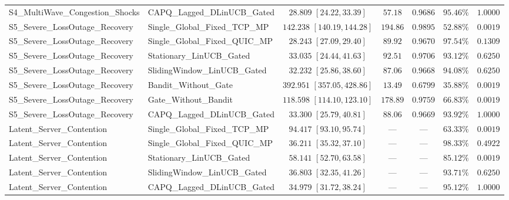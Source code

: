 \documentclass[10pt,journal,compsoc]{IEEEtran}
\begin{document}
\begin{table}[!t]
\begin{adjustbox}{max width=\textwidth}
\begin{tabular}{@{}llccccc@{}}
S4\_MultiWave\_Congestion\_Shocks & CAPQ\_Lagged\_DLinUCB\_Gated & $28.809$ $[24.22, 33.39]$ & $57.18$ & $0.9686$ & $95.46\%$ & $1.0000$ \\
S5\_Severe\_LossOutage\_Recovery & Single\_Global\_Fixed\_TCP\_MP & $142.238$ $[140.19, 144.28]$ & $194.86$ & $0.9895$ & $52.88\%$ & $0.0019$ \\
S5\_Severe\_LossOutage\_Recovery & Single\_Global\_Fixed\_QUIC\_MP & $28.243$ $[27.09, 29.40]$ & $89.92$ & $0.9670$ & $97.54\%$ & $0.1309$ \\
S5\_Severe\_LossOutage\_Recovery & Stationary\_LinUCB\_Gated & $33.035$ $[24.44, 41.63]$ & $92.51$ & $0.9706$ & $93.12\%$ & $0.6250$ \\
S5\_Severe\_LossOutage\_Recovery & SlidingWindow\_LinUCB\_Gated & $32.232$ $[25.86, 38.60]$ & $87.06$ & $0.9668$ & $94.08\%$ & $0.6250$ \\
S5\_Severe\_LossOutage\_Recovery & Bandit\_Without\_Gate & $392.951$ $[357.05, 428.86]$ & $13.49$ & $0.6799$ & $35.88\%$ & $0.0019$ \\
S5\_Severe\_LossOutage\_Recovery & Gate\_Without\_Bandit & $118.598$ $[114.10, 123.10]$ & $178.89$ & $0.9759$ & $66.83\%$ & $0.0019$ \\
S5\_Severe\_LossOutage\_Recovery & CAPQ\_Lagged\_DLinUCB\_Gated & $33.300$ $[25.79, 40.81]$ & $88.06$ & $0.9669$ & $93.92\%$ & $1.0000$ \\
\midrule
Latent\_Server\_Contention & Single\_Global\_Fixed\_TCP\_MP & $94.417$ $[93.10, 95.74]$ & --- & --- & $63.33\%$ & $0.0019$ \\
Latent\_Server\_Contention & Single\_Global\_Fixed\_QUIC\_MP & $36.211$ $[35.32, 37.10]$ & --- & --- & $98.33\%$ & $0.4922$ \\
Latent\_Server\_Contention & Stationary\_LinUCB\_Gated & $58.141$ $[52.70, 63.58]$ & --- & --- & $85.12\%$ & $0.0019$ \\
Latent\_Server\_Contention & SlidingWindow\_LinUCB\_Gated & $36.803$ $[32.35, 41.26]$ & --- & --- & $93.71\%$ & $0.6250$ \\
Latent\_Server\_Contention & CAPQ\_Lagged\_DLinUCB\_Gated & $34.979$ $[31.72, 38.24]$ & --- & --- & $95.12\%$ & $1.0000$ \\
\bottomrule
\end{tabular}
\end{adjustbox}
\end{table}
\end{document}
